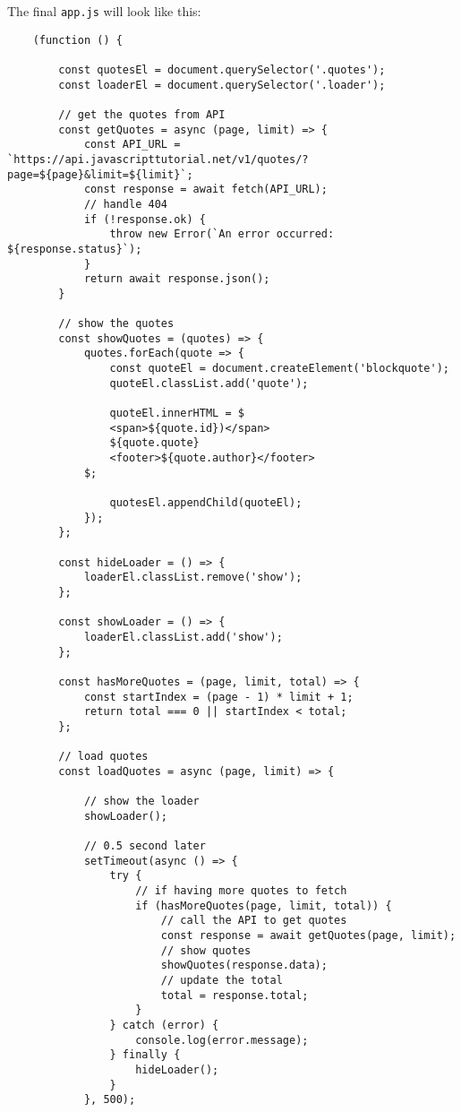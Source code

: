 \documentclass[11pt]{article}
\begin{document}
\noindent
The final \verb|app.js| will look like this:

\begin{lstlisting}
    (function () {

        const quotesEl = document.querySelector('.quotes');
        const loaderEl = document.querySelector('.loader');

        // get the quotes from API
        const getQuotes = async (page, limit) => {
            const API_URL = `https://api.javascripttutorial.net/v1/quotes/?page=${page}&limit=${limit}`;
            const response = await fetch(API_URL);
            // handle 404
            if (!response.ok) {
                throw new Error(`An error occurred: ${response.status}`);
            }
            return await response.json();
        }

        // show the quotes
        const showQuotes = (quotes) => {
            quotes.forEach(quote => {
                const quoteEl = document.createElement('blockquote');
                quoteEl.classList.add('quote');

                quoteEl.innerHTML = $
                <span>${quote.id})</span>
                ${quote.quote}
                <footer>${quote.author}</footer>
            $;

                quotesEl.appendChild(quoteEl);
            });
        };

        const hideLoader = () => {
            loaderEl.classList.remove('show');
        };

        const showLoader = () => {
            loaderEl.classList.add('show');
        };

        const hasMoreQuotes = (page, limit, total) => {
            const startIndex = (page - 1) * limit + 1;
            return total === 0 || startIndex < total;
        };

        // load quotes
        const loadQuotes = async (page, limit) => {

            // show the loader
            showLoader();

            // 0.5 second later
            setTimeout(async () => {
                try {
                    // if having more quotes to fetch
                    if (hasMoreQuotes(page, limit, total)) {
                        // call the API to get quotes
                        const response = await getQuotes(page, limit);
                        // show quotes
                        showQuotes(response.data);
                        // update the total
                        total = response.total;
                    }
                } catch (error) {
                    console.log(error.message);
                } finally {
                    hideLoader();
                }
            }, 500);


\end{lstlisting}
\end{document}
